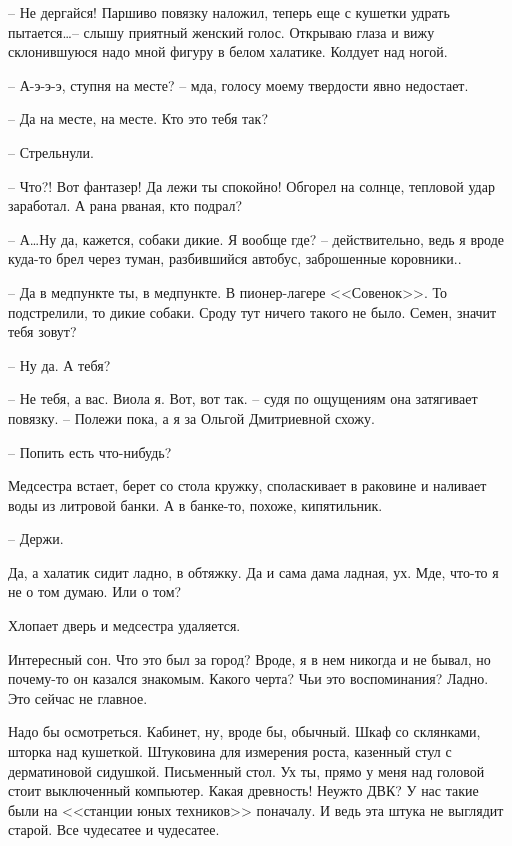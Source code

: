 \documentclass[a4paper]{book}
\begin{document}
-- Не дергайся! Паршиво повязку наложил, теперь еще с кушетки удрать пытается\ldots -- слышу приятный женский голос. Открываю глаза и вижу склонившуюся надо мной фигуру в белом халатике. Колдует над ногой. 

-- А-э-э-э, ступня на месте? -- мда, голосу моему твердости явно недостает.

-- Да на месте, на месте. Кто это тебя так?

-- Стрельнули.  

-- Что?! Вот фантазер! Да лежи ты спокойно! Обгорел на солнце, тепловой удар заработал. А рана рваная, кто подрал?

-- А\ldots Ну да, кажется, собаки дикие. Я вообще где? -- действительно, ведь я вроде куда-то брел через туман, разбившийся автобус, заброшенные коровники.. 

-- Да в медпункте ты, в медпункте. В пионер-лагере <<Совенок>>. То подстрелили, то дикие собаки. Сроду тут ничего такого не было. Семен, значит тебя зовут?

-- Ну да. А тебя?

-- Не тебя, а вас. Виола я. Вот, вот так. -- судя по ощущениям она затягивает повязку. -- Полежи пока, а я за Ольгой Дмитриевной схожу. 

-- Попить есть что-нибудь? 

Медсестра встает, берет со стола кружку, споласкивает в раковине и наливает воды из литровой банки. А в банке-то, похоже, кипятильник.

-- Держи.

Да, а халатик сидит ладно, в обтяжку. Да и сама дама ладная, ух. Мде, что-то я не о том думаю. Или о том?

Хлопает дверь и медсестра удаляется. 

Интересный сон. Что это был за город? Вроде, я в нем никогда и не бывал, но почему-то он казался знакомым. Какого черта? Чьи это воспоминания? Ладно. Это сейчас не главное.

Надо бы осмотреться. Кабинет, ну, вроде бы, обычный. Шкаф со склянками, шторка над кушеткой. Штуковина для измерения роста, казенный стул с дерматиновой сидушкой. Письменный стол. Ух ты, прямо у меня над головой стоит выключенный компьютер. Какая древность! Неужто ДВК? У нас такие были на <<станции юных техников>> поначалу. И ведь эта штука не выглядит старой. Все чудесатее и чудесатее. 
\end{document}
